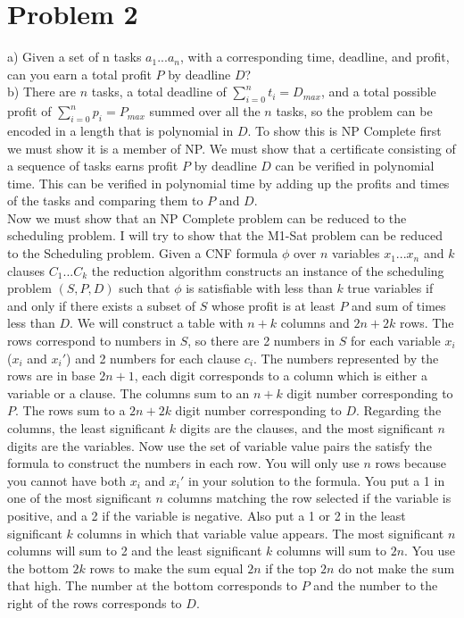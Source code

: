 \documentclass{article}
\begin{document}
\section*{Problem 2}
a) Given a set of n tasks $a_1 ... a_n$, with a corresponding time, deadline, and profit, can you earn a total profit $P$ by deadline $D$?\\
b) There are $n$ tasks, a total deadline of $\sum_{i=0}^nt_i = D_{max}$, and a total possible profit of $\sum_{i=0}^np_i = P_{max}$ summed over all the $n$ tasks, so the problem can be encoded in a length that is polynomial in $D$. To show this is NP Complete first we must show it is a member of NP. We must show that a certificate consisting of a sequence of tasks earns profit $P$ by deadline $D$ can be verified in polynomial time.  This can be verified in polynomial time by adding up the profits and times of the tasks and comparing them to $P$ and $D$.\\
Now we must show that an NP Complete problem can be reduced to the scheduling problem. I will try to show that the M1-Sat problem can be reduced to the Scheduling problem. Given a CNF formula $\phi$ over $n$ variables $x_1 ... x_n$ and $k$ clauses $C_1 ... C_k$ the reduction algorithm constructs an instance of the scheduling problem $(S, P, D)$ such that $\phi$ is satisfiable with less than $k$ true variables if and only if there exists a subset of $S$ whose profit is at least $P$ and sum of times less than $D$. We will construct a table with $n+k$ columns and $2n + 2k$ rows. The rows correspond to numbers in $S$, so there are 2 numbers in $S$ for each variable $x_i$ ($x_i$ and $x_i'$) and 2 numbers for each clause $c_i$. The numbers represented by the rows are in base $2n+1$, each digit corresponds to a column which is either a variable or a clause. The columns sum to an $n+k$ digit number corresponding to $P$. The rows sum to a $2n + 2k$ digit number corresponding to $D$. Regarding the columns, the least significant $k$ digits are the clauses, and the most significant $n$ digits are the variables.  Now use the set of variable value pairs the satisfy the formula to construct the numbers in each row. You will only use $n$ rows because you cannot have both $x_i$ and $x_i'$ in your solution to the formula. You put a 1 in one of the most significant $n$ columns matching the row selected if the variable is positive, and a 2 if the variable is negative. Also put a 1 or 2 in the least significant $k$ columns in which that variable value appears. The most significant $n$ columns will sum to 2 and the least significant $k$ columns will sum to $2n$.  You use the bottom $2k$ rows to make the sum equal $2n$ if the top $2n$ do not make the sum that high. The number at the bottom corresponds to $P$ and the number to the right of the rows corresponds to $D$.\\\\ 
\end{document}

